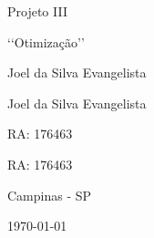 \begin{titlepage}
\begin{center}
\vfill




{\fontsize{36}{\baselineskip}\selectfont
Projeto III
}

\vfill




{\fontsize{36}{\baselineskip}\selectfont
‘‘Otimização’’
}

\vfill





\begin{minipage}{0.7\linewidth}
	{\onehalfspacing\fontsize{20}{\baselineskip}\selectfont
	
    Joel da Silva Evangelista
    
    Joel da Silva Evangelista 
    
    }
\end{minipage}
\begin{minipage}{0.25\linewidth}
	{\onehalfspacing\fontsize{18}{\baselineskip}\selectfont
	RA: 176463
	
	RA: 176463
	
	}
\end{minipage}

\vfill





{\fontsize{14}{\baselineskip}\selectfont
	Campinas - SP

	\today
}

\end{center}
\end{titlepage}